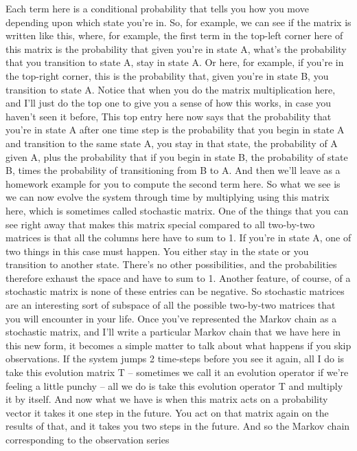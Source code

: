 \documentclass[]{article}
\begin{document}
Each term here
is a conditional probability
that tells you how you move
depending upon which state you’re in.
So, for example, we can see
if the matrix is written like this,
where, for example, the first term
in the top-left corner here of this matrix
is the probability
that given you’re in state A,
what’s the probability
that you transition to state A,
stay in state A.
Or here, for example,
if you’re in the top-right corner,
this is the probability that,
given you’re in state B,
you transition to state A.
Notice that when you do
the matrix multiplication here,
and I’ll just do the top one
to give you a sense of how this works,
in case you haven’t seen it before,
This top entry here now says
that the probability
that you’re in state A
after one time step
is the probability
that you begin in state A
and transition to the same state A,
you stay in that state,
the probability of A given A,
plus the probability
that if you begin in state B,
the probability of state B,
times the probability
of transitioning from B to A.
And then we’ll leave as a homework example
for you to compute the second term here.
So what we see is we can now
evolve the system through time
by multiplying using this matrix here,
which is sometimes called
stochastic matrix.
One of the things
that you can see right away
that makes this matrix special
compared to all two-by-two matrices
is that all the columns here
have to sum to 1.
If you’re in state A,
one of two things
in this case must happen.
You either stay in the state
or you transition to another state.
There’s no other possibilities,
and the probabilities therefore exhaust
the space and have to sum to 1.
Another feature, of course,
of a stochastic matrix
is none of these entries can be negative.
So stochastic matrices are
an interesting sort of subspace
of all the possible two-by-two matrices
that you will encounter in your life.
Once you’ve represented the Markov chain
as a stochastic matrix,
and I’ll write a particular Markov chain
that we have here in this new form,
it becomes a simple matter
to talk about what happens
if you skip observations.
If the system jumps 2 time-steps
before you see it again,
all I do is take this evolution matrix T –
sometimes we call it an evolution operator
if we’re feeling a little punchy –
all we do is take
this evolution operator T
and multiply it by itself.
And now what we have
is when this matrix
acts on a probability vector
it takes it one step in the future.
You act on that matrix again
on the results of that,
and it takes you two steps in the future.
And so the Markov chain corresponding
to the observation series
\end{document}
